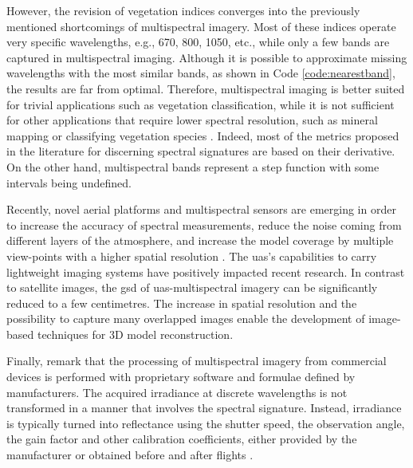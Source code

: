 However, the revision of vegetation indices converges into the previously mentioned shortcomings of multispectral imagery. Most of these indices operate very specific wavelengths, e.g., 670, 800, 1050, etc., while only a few bands are captured in multispectral imaging. Although it is possible to approximate missing wavelengths with the most similar bands, as shown in Code \ref{code:nearestband}, the results are far from optimal. Therefore, multispectral imaging is better suited for trivial applications such as vegetation classification, while it is not sufficient for other applications that require lower spectral resolution, such as mineral mapping or classifying vegetation species \cite{navulur_multispectral_2006, pu_hyperspectral_2017}. Indeed, most of the metrics proposed in the literature for discerning spectral signatures are based on their derivative. On the other hand, multispectral bands represent a step function with some intervals being undefined.

\vspace{3mm}



Recently, novel aerial platforms and multispectral sensors are emerging in order to increase the accuracy of spectral measurements, reduce the noise coming from different layers of the atmosphere, and increase the model coverage by multiple view-points with a higher spatial resolution \cite{deng_uav-based_2018}. The \acrshort{uas}’s capabilities to carry lightweight imaging systems have positively impacted recent research. In contrast to satellite images, the \acrshort{gsd} of \acrshort{uas}-multispectral imagery can be significantly reduced to a few centimetres. The increase in spatial resolution and the possibility to capture many overlapped images enable the development of image-based techniques for 3D model reconstruction.

Finally, remark that the processing of multispectral imagery from commercial devices is performed with proprietary software and formulae defined by manufacturers. The acquired irradiance at discrete wavelengths is not transformed in a manner that involves the spectral signature. Instead, irradiance is typically turned into reflectance using the shutter speed, the observation angle, the gain factor and other calibration coefficients, either provided by the manufacturer or obtained before and after flights \cite{jurado_semantic_2020, candiago_evaluating_2015}.

